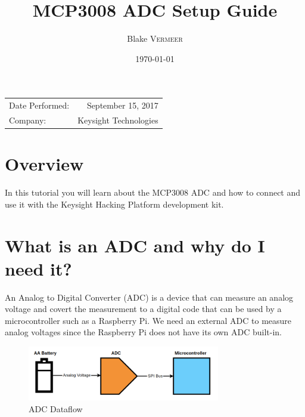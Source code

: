 \documentclass{article}
\title{MCP3008 ADC Setup Guide} %
\author{Blake \textsc{Vermeer}} %
\date{\today} %
\begin{document}
\maketitle %

\begin{center}
\begin{tabular}{l r}
Date Performed: & September 15, 2017 \\ %
Company: & Keysight Technologies %
\end{tabular}
\end{center}


\section{Overview}

In this tutorial you will learn about the MCP3008 ADC and how to connect and use it with the Keysight Hacking Platform development kit.


\section{What is an ADC and why do I need it?}

An Analog to Digital Converter (ADC) is a device that can measure an analog voltage and covert the measurement to a digital code that can be used by a microcontroller such as a Raspberry Pi. We need an external ADC to measure analog voltages since the Raspberry Pi does not have its own ADC built-in.

	\begin{figure}[H]
		\centering
		\includegraphics[width=0.75\textwidth]{pics/ADC_Dataflow.png}
		\caption{ADC Dataflow}
		\label{ADC_Dataflow}
	\end{figure}
\end{document}

